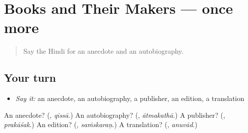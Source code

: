 \section[(dialogue)]{Books and Their Makers — once more}

\label{lesson:HI-R342-review-final-342}



\begin{quote}
Say the Hindi for an anecdote and an autobiography.
\end{quote}

\subsection*{Your turn}
\begin{itemize}
\raggedright
  \item \emph{Say it:} an anecdote, an autobiography, a publisher, an edition, a translation
\end{itemize}

\begin{tcolorbox}[breakable,colback=teal!4,colframe=teal!35!black,title={Before you move on}]
An anecdote? (\textbf{}, \emph{qissā}.) An autobiography? (\textbf{}, \emph{ātmakathā}.) A publisher? (\textbf{}, \emph{prakāśak}.) An edition? (\textbf{}, \emph{saṁskaraṇ}.) A translation? (\textbf{}, \emph{anuvād}.)
\end{tcolorbox}
